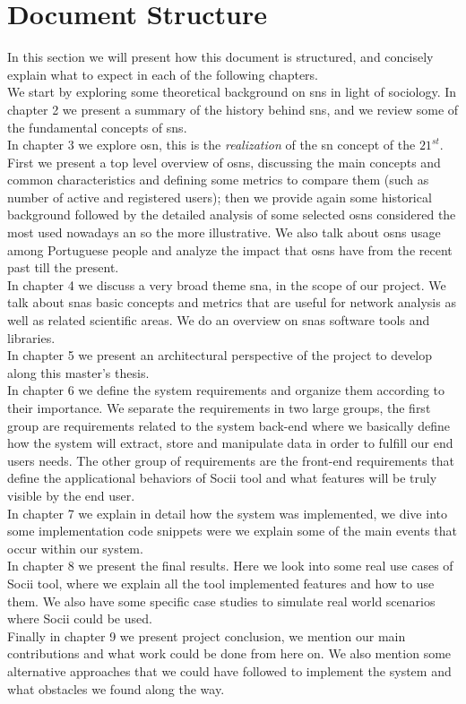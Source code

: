 \section{Document Structure}
In this section we will present how this document is structured, and concisely explain what to expect in each of the following chapters.\\
\indent We start by exploring some theoretical background on \glspl{sn} in light of sociology. In chapter 2 we present a summary of the history behind \glspl{sn}, and we review some of the fundamental concepts of \glspl{sn}.\\
\indent In chapter 3 we explore \acrfull{osn}, this is the \textit{realization} of the \gls{sn} concept of the $21^{st}$. First we present a top level overview of \glspl{osn}, discussing the main concepts and common characteristics and defining some metrics to compare them (such as number of active and registered users); then we provide again some historical background followed by the detailed analysis of some selected \glspl{osn} considered the most used nowadays an so the more illustrative. We also talk about \glspl{osn} usage among Portuguese people and analyze the impact that \glspl{osn} have from the recent past till the present.\\
\indent In chapter 4 we discuss a very broad theme \acrfull{sna}, in the scope of our project. We talk about \glspl{sna} basic concepts and metrics that are useful for network analysis as well as related scientific areas. We do an overview on \glspl{sna} software tools and libraries.\\
\indent In chapter 5 we present an architectural perspective of the project to develop along this master's thesis.\\
\indent In chapter 6 we define the system requirements and organize them according to their importance. We separate the requirements in two large groups, the first group are requirements related to the system back-end where we basically define how the system will extract, store and manipulate data in order to fulfill our end users needs. The other group of requirements are the front-end requirements that define the applicational behaviors of Socii tool and what features will be truly visible by the end user.\\
\indent In chapter 7 we explain in detail how the system was implemented, we dive into some implementation code snippets were we explain some of the main events that occur within our system.\\
\indent In chapter 8 we present the final results. Here we look into some real use cases of Socii tool, where we explain all the tool implemented features and how to use them. We also have some specific case studies to simulate real world scenarios where Socii could be used.\\
\indent Finally in chapter 9 we present project conclusion, we mention our main contributions and what work could be done from here on. We also mention some alternative approaches that we could have followed to implement the system and what obstacles we found along the way.
